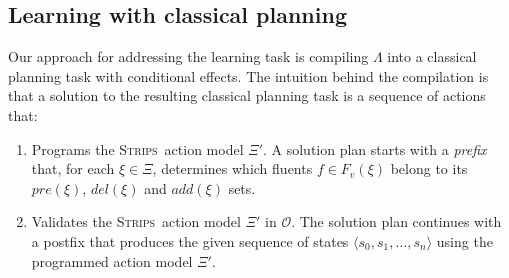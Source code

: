 \documentclass{article}
\newcommand{\tup}[1]{{\langle #1 \rangle}}
\newcommand{\strips}{\textsc{Strips}}     %
\begin{document}
\subsection{Learning with classical planning}

Our approach for addressing the learning task is compiling $\Lambda$ into a classical planning task with conditional effects. The intuition behind the compilation is that a solution to the resulting classical planning task is a sequence of actions that:

\begin{enumerate}
\item Programs the \strips\ action model $\Xi'$. A solution plan starts with a {\em prefix} that, for each $\xi\in\Xi$, determines which fluents $f\in F_v(\xi)$ belong to its $pre(\xi)$, $del(\xi)$ and $add(\xi)$ sets.
\item Validates the \strips\ action model $\Xi'$ in $\mathcal{O}$. The solution plan continues with a postfix that produces the given sequence of states $\tup{s_0,s_1,\ldots,s_{n}}$ using the programmed action model $\Xi'$.
\end{enumerate}
\end{document}

